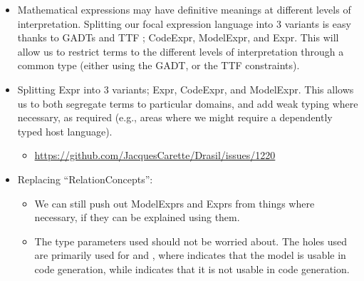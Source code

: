 \begin{itemize}

	\item Mathematical expressions may have definitive meanings at different
	      levels of interpretation. Splitting our focal expression language into
	      3 variants is easy thanks to GADTs and TTF \cite{Carette2009};
	      CodeExpr, ModelExpr, and Expr. This will allow us to restrict terms to
	      the different levels of interpretation through a common type (either
	      using the GADT, or the TTF constraints).

	\item Splitting Expr into 3 variants; Expr, CodeExpr, and ModelExpr. This
	      allows us to both segregate terms to particular domains, and add weak
	      typing where necessary, as required (e.g., areas where we might
	      require a dependently typed host language).

	      \begin{itemize}

		      \item
		            \url{https://github.com/JacquesCarette/Drasil/issues/1220}

	      \end{itemize}


	\item Replacing ``RelationConcepts'':

	      \begin{itemize}

		      \item We can still push out ModelExprs and Exprs from things where
		            necessary, if they can be explained using them.

		      \item The type parameters used should not be worried about. The
		            holes used are primarily used for \Expr{} and \ModelExpr{},
		            where \Expr{} indicates that the model is usable in code
		            generation, while \ModelExpr{} indicates that it is not
		            usable in code generation.

	      \end{itemize}

\end{itemize}

